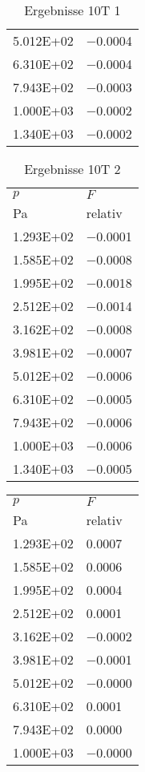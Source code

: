 \begin{table}
\begin{tabular}{l l }
\num{5.012E+02}&\num{-0.0004}\\
\num{6.310E+02}&\num{-0.0004}\\
\num{7.943E+02}&\num{-0.0003}\\
\num{1.000E+03}&\num{-0.0002}\\
\num{1.340E+03}&\num{-0.0002}\\
\bottomrule
\end{tabular}\caption{Ergebnisse 10T 1}\end{table}\begin{table}\begin{tabular}{l l }
\toprule
$p$&$F$\\
 Pa & relativ \\\midrule
\num{1.293E+02}&\num{-0.0001}\\
\num{1.585E+02}&\num{-0.0008}\\
\num{1.995E+02}&\num{-0.0018}\\
\num{2.512E+02}&\num{-0.0014}\\
\num{3.162E+02}&\num{-0.0008}\\
\num{3.981E+02}&\num{-0.0007}\\
\num{5.012E+02}&\num{-0.0006}\\
\num{6.310E+02}&\num{-0.0005}\\
\num{7.943E+02}&\num{-0.0006}\\
\num{1.000E+03}&\num{-0.0006}\\
\num{1.340E+03}&\num{-0.0005}\\
\bottomrule
\end{tabular}\caption{Ergebnisse 10T 2}\end{table}\begin{table}\begin{tabular}{l l }
\toprule
$p$&$F$\\
 Pa & relativ \\\midrule
\num{1.293E+02}&\num{0.0007}\\
\num{1.585E+02}&\num{0.0006}\\
\num{1.995E+02}&\num{0.0004}\\
\num{2.512E+02}&\num{0.0001}\\
\num{3.162E+02}&\num{-0.0002}\\
\num{3.981E+02}&\num{-0.0001}\\
\num{5.012E+02}&\num{-0.0000}\\
\num{6.310E+02}&\num{0.0001}\\
\num{7.943E+02}&\num{0.0000}\\
\num{1.000E+03}&\num{-0.0000}\\

\end{tabular}
\end{table}
